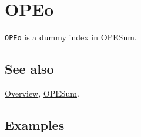 \documentclass[../FeynCalcManual.tex]{subfiles}
\begin{document}
\hypertarget{opeo}{%
\section{OPEo}\label{opeo}}

\texttt{OPEo} is a dummy index in OPESum.

\subsection{See also}

\hyperlink{toc}{Overview}, \hyperlink{opesum}{OPESum}.

\subsection{Examples}
\end{document}
